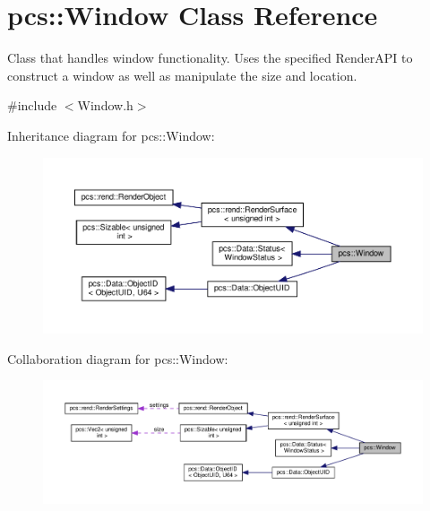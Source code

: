 \hypertarget{classpcs_1_1Window}{}\section{pcs\+:\+:Window Class Reference}
\label{classpcs_1_1Window}


Class that handles window functionality. Uses the specified Render\+A\+PI to construct a window as well as manipulate the size and location.  




{\ttfamily \#include $<$Window.\+h$>$}



Inheritance diagram for pcs\+:\+:Window\+:
\nopagebreak
\begin{figure}[H]
\begin{center}
\leavevmode
\includegraphics[width=350pt]{classpcs_1_1Window__inherit__graph}
\end{center}
\end{figure}


Collaboration diagram for pcs\+:\+:Window\+:
\nopagebreak
\begin{figure}[H]
\begin{center}
\leavevmode
\includegraphics[width=350pt]{classpcs_1_1Window__coll__graph}
\end{center}
\end{figure}
